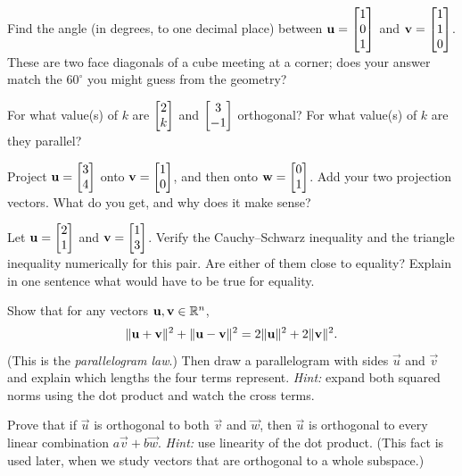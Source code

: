 \begin{exercise}
Find the angle (in degrees, to one decimal place) between
$\mathbf{u}=\begin{bmatrix}1\\0\\1\end{bmatrix}$ and $\mathbf{v}=\begin{bmatrix}1\\1\\0\end{bmatrix}$. These are two face diagonals
of a cube meeting at a corner; does your answer match the $60^\circ$ you might guess
from the geometry?
\end{exercise}

\begin{exercise}
For what value(s) of $k$ are $\begin{bmatrix}2\\k\end{bmatrix}$ and $\begin{bmatrix}3\\-1\end{bmatrix}$ orthogonal? For
what value(s) of $k$ are they parallel?
\end{exercise}

\begin{exercise}
Project $\mathbf{u}=\begin{bmatrix}3\\4\end{bmatrix}$ onto $\mathbf{v}=\begin{bmatrix}1\\0\end{bmatrix}$, and then onto
$\mathbf{w}=\begin{bmatrix}0\\1\end{bmatrix}$. Add your two projection vectors. What do you get, and why
does it make sense?
\end{exercise}

\begin{exercise}
Let $\mathbf{u}=\begin{bmatrix}2\\1\end{bmatrix}$ and $\mathbf{v}=\begin{bmatrix}1\\3\end{bmatrix}$. Verify the Cauchy--Schwarz
inequality and the triangle inequality numerically for this pair. Are either of them
close to equality? Explain in one sentence what would have to be true for equality.
\end{exercise}

\begin{exercise}
Show that for any vectors $\mathbf{u},\mathbf{v}\in\mathbb{R}^n$,
\[
  \lVert\mathbf{u}+\mathbf{v}\rVert^2 + \lVert\mathbf{u}-\mathbf{v}\rVert^2 = 2\lVert\mathbf{u}\rVert^2 + 2\lVert\mathbf{v}\rVert^2.
\]
(This is the \emph{parallelogram law}.) Then draw a parallelogram with sides
$\vec u$ and $\vec v$ and explain which lengths the four terms represent.
\emph{Hint:} expand both squared norms using the dot product and watch the cross
terms.
\end{exercise}

\begin{exercise}
Prove that if $\vec u$ is orthogonal to both $\vec v$ and $\vec w$, then $\vec u$ is
orthogonal to every linear combination $a\vec v + b\vec w$. \emph{Hint:} use
linearity of the dot product. (This fact is used later, when we study vectors that
are orthogonal to a whole subspace.)
\end{exercise}

